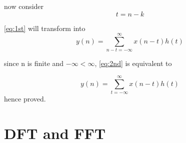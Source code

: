 \documentclass[journal,12pt,twocolumn]{IEEEtran}
\renewcommand\thesection{\arabic{section}}
\begin{document}
\begin{enumerate}[label=\thesection.\arabic*]
now consider
\begin{equation}
    t = n-k
\end{equation}

\ref{eq:1st} will transform into 
\begin{equation}
y(n) =  \sum_{n-t=-\infty}^{\infty}x(n-t)h(t) \label{eq:2nd}
\end{equation}

since n is finite and $-\infty < \infty$, \ref{eq:2nd} is equivalent to 

\begin{equation}
y(n) =  \sum_{t=-\infty}^{\infty}x(n-t)h(t) \label{eq:3nd}
\end{equation}
hence proved.
\end{enumerate}

%
\section{DFT and FFT}
\end{document}
